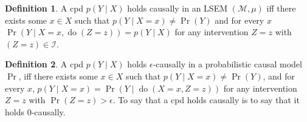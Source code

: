 \documentclass{article}
\theoremstyle{plain}
\theoremstyle{definition}
\newtheorem{defn}{Definition}
\theoremstyle{remark}
\newcommand{\cdo}{\mathop{\mathrm{do}}}
\begin{document}



\begin{defn}
	A cpd $p(Y \mid X)$ holds causally in an LSEM $(\mathcal M, \mu)$ iff there exists some 
	 $x \in X$ such that $p(Y \mid X=x) \neq \Pr(Y)$ and for every $x$ $\Pr(Y \mid X=x, \cdo(Z=z)) = p(Y \mid X)$
		for any intervention $Z=z$ with $(Z = z) \in \mathcal I$. 
\end{defn}

\begin{defn}
	A cpd $p(Y \mid X)$ holds $\epsilon$-causally in a probabilistic causal model $\Pr$, iff there exists some $x \in X$ such that 
	$p(Y \mid X=x) \neq \Pr(Y)$, and for every $x$,  $p(Y \mid X=x) = \Pr(Y \mid \cdo(X=x,Z=z))$
	for any intervention $Z=z$ with $\Pr(Z = z) > \epsilon$. 
	To say that a cpd holds causally is to say that it holds $0$-causally.	
\end{defn} 




\end{document}
